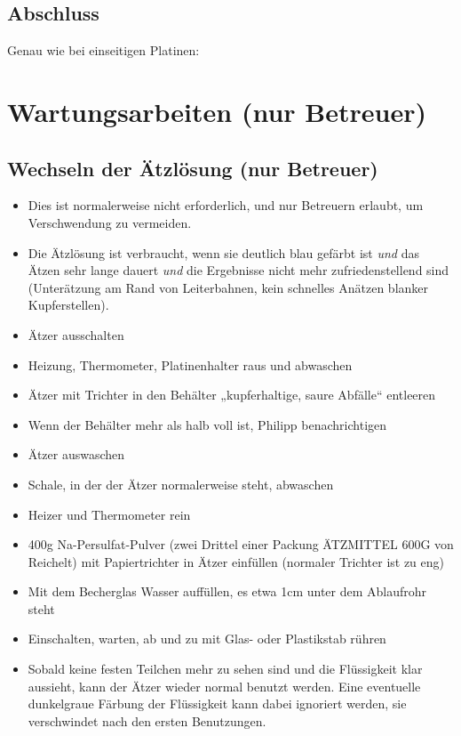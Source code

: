 \documentclass{\basedir/fablab-document}
\begin{document}
\subsection{Abschluss}
Genau wie bei einseitigen Platinen:

\abschluss

\section{Wartungsarbeiten (nur Betreuer)}

\subsection{Wechseln der Ätzlösung (nur Betreuer)}
\begin{itemize}
\item Dies ist normalerweise nicht erforderlich, und nur Betreuern erlaubt, um Verschwendung zu vermeiden.
\item Die Ätzlösung ist verbraucht, wenn sie deutlich blau gefärbt ist \emph{und} das Ätzen sehr lange dauert \emph{und} die Ergebnisse nicht mehr zufriedenstellend sind (Unterätzung am Rand von Leiterbahnen, kein schnelles Anätzen blanker Kupferstellen).
\item Ätzer ausschalten
\end{itemize}
\begin{itemize}
\item Heizung, Thermometer, Platinenhalter raus und abwaschen
\item Ätzer mit Trichter in den Behälter „kupferhaltige, saure Abfälle“ entleeren
\item Wenn der Behälter mehr als halb voll ist, Philipp benachrichtigen
\item Ätzer auswaschen
\item Schale, in der der Ätzer normalerweise steht, abwaschen
\item Heizer und Thermometer rein
\item 400g Na-Persulfat-Pulver (zwei Drittel einer Packung ÄTZMITTEL 600G von Reichelt) mit Papiertrichter in Ätzer einfüllen (normaler Trichter ist zu eng)
\item Mit dem Becherglas Wasser auffüllen, es etwa 1cm unter dem Ablaufrohr steht
\item Einschalten, warten, ab und zu mit Glas- oder Plastikstab rühren
\item Sobald keine festen Teilchen mehr zu sehen sind und die Flüssigkeit klar aussieht, kann der Ätzer wieder normal benutzt werden. Eine eventuelle dunkelgraue Färbung der Flüssigkeit kann dabei ignoriert werden, sie verschwindet nach den ersten Benutzungen.
\end{itemize}
\end{document}
